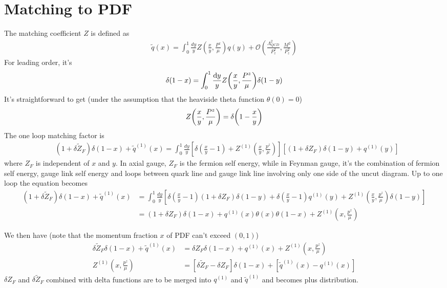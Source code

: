 \documentclass{article}
\begin{document}
\section{Matching to PDF}
The matching coefficient $Z$ is defined as
\begin{align}
	\tilde{q}(x)=\int_{0}^{1} \frac{d y}{y} Z\left(\frac{x}{y}, \frac{P^{z}}{\mu}\right) q(y)+\mathcal{O}\left(\frac{\Lambda_{Q C D}^{2}}{P_{z}^{2}}, \frac{M^{2}}{P_{z}^{2}}\right)
\end{align}
For leading order, it's
\begin{align}
	\delta(1-x)=\int_0^1\frac{\dd y}{y}Z\pqty{\frac{x}{y},\frac{P^z}{\mu}}\delta(1-y)
\end{align}
It's straightforward to get (under the assumption that the heaviside theta function $\theta(0)=0$)
\begin{align}
	Z\pqty{\frac{x}{y},\frac{P^z}{\mu}}=\delta\pqty{1-\frac{x}{y}}
\end{align}
The one loop matching factor is
\begin{align}
	  & \left(1+\delta \tilde{Z}_{F}\right) \delta(1-x)+\tilde{q}^{(1)}(x)
	= \int_{0}^{1} \frac{d y}{y}\left[\delta\left(\frac{x}{y}-1\right)+Z^{(1)}\left(\frac{x}{y}, \frac{p^{z}}{\mu}\right)\right]\left[\left(1+\delta Z_{F}\right) \delta(1-y)+q^{(1)}(y)\right]
\end{align}
where $Z_F$ is independent of $x$ and $y$. In axial gauge, $Z_F$ is the fermion self energy, while in Feynman gauge, it's the combination of fermion self energy, gauge link self energy and loops between quark line and gauge link line involving only one side of the uncut diagram. Up to one loop the equation becomes
\begin{align*}
	\left(1+\delta \tilde{Z}_{F}\right) \delta(1-x)+\tilde{q}^{(1)}(x)
	  & = \int_{0}^{1} \frac{d y}{y}\left[\delta\left(\frac{x}{y}-1\right)\left(1+\delta Z_{F}\right) \delta(1-y)+\delta\left(\frac{x}{y}-1\right)q^{(1)}(y)+Z^{(1)}\left(\frac{x}{y}, \frac{p^{z}}{\mu}\right) \delta(1-y)\right] \\
	  & = \left(1+\delta Z_{F}\right) \delta(1-x)+q^{(1)}(x)\theta(x)\theta(1-x)+Z^{(1)}\left(x, \frac{p^{z}}{\mu}\right)
\end{align*}

We then have (note that the momentum fraction $x$ of PDF can't exceed $(0,1)$)
\begin{align}
	\delta \tilde{Z}_{F} \delta(1-x)+\tilde{q}^{(1)}(x) & = \delta Z_{F}\delta(1-x)+q^{(1)}(x)+Z^{(1)}\left(x, \frac{p^{z}}{\mu}\right)                          \\
	Z^{(1)}\left(x, \frac{p^{z}}{\mu}\right)            & =\left[\delta \tilde{Z}_{F}-\delta Z_{F}\right] \delta(1-x)+\left[\tilde{q}^{(1)}(x)-q^{(1)}(x)\right]
\end{align}
$\delta Z_F$ and $\delta \tilde Z_F$ combined with delta functions are to be merged into $q^{(1)}$ and $\tilde q^{(1)}$ and becomes plus distribution.
\end{document}
